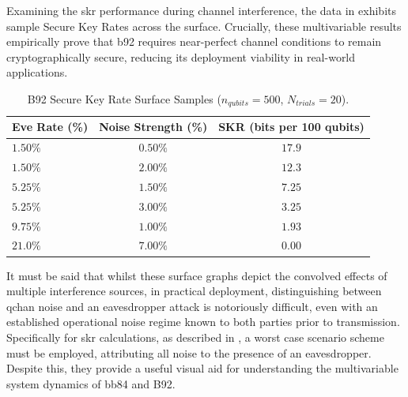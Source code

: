 Examining the \gls{skr} performance during channel interference, the data in  exhibits sample Secure Key Rates across the surface. Crucially, these multivariable results empirically prove that \gls{b92} requires near-perfect channel conditions to remain cryptographically secure, reducing its deployment viability in real-world applications.

\begin{table}[htbp]
    \centering
    \caption{B92 Secure Key Rate Surface Samples ($n_{qubits}=500$, $N_{trials}=20$).}
    \label{tab:b92SKRsurface}
    \footnotesize
    \begin{tabular}{@{}l c c@{}}
        \toprule
        \textbf{Eve Rate (\%)} & \textbf{Noise Strength (\%)} & \textbf{SKR (bits per 100 qubits)}\\
        \midrule
        $1.50\%$ & $0.50\%$ & \textbf{$17.9$} \\
        $1.50\%$ & $2.00\%$ & \textbf{$12.3$} \\
        $5.25\%$ & $1.50\%$ & \textbf{$7.25$} \\
        $5.25\%$ & $3.00\%$ & \textbf{$3.25$} \\
        $9.75\%$ & $1.00\%$ & \textbf{$1.93$} \\
        $21.0\%$ & $7.00\%$ & \textbf{$0.00$} \\
        \bottomrule
    \end{tabular}
\end{table}

It must be said that whilst these surface graphs depict the convolved effects of multiple interference sources, in practical deployment, distinguishing between \gls{qchan} noise and an eavesdropper attack is notoriously difficult, even with an established operational noise regime known to both parties prior to transmission. 
Specifically for \gls{skr} calculations, as described in , a worst case scenario scheme must be employed, attributing all noise to the presence of an eavesdropper. Despite this, they provide a useful visual aid for understanding the multivariable system dynamics of \gls{bb84} and B92.
